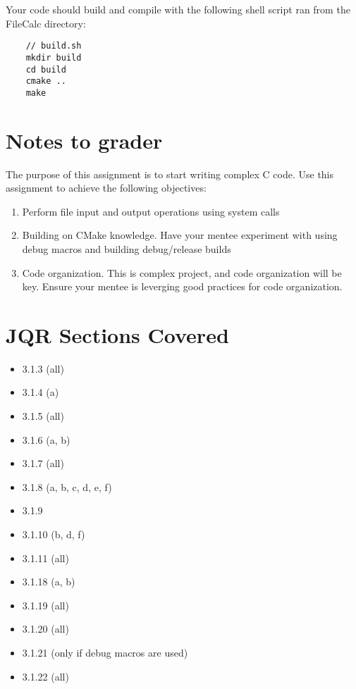 \documentclass[letterpaper,12pt]{article}
\begin{document}
	Your code should build and compile with the following shell script ran from the FileCalc directory:

	\begin{lstlisting}
	// build.sh
	mkdir build
	cd build
	cmake .. 
	make
	\end{lstlisting}
	
	
	\section{Notes to grader}
	The purpose of this assignment is to start writing complex C code. Use this assignment to achieve the following objectives:
	\begin{enumerate}
		\item Perform file input and output operations using system calls
		\item Building on CMake knowledge. Have your mentee experiment with using debug macros and building debug/release builds
		\item Code organization. This is complex project, and code organization will be key. Ensure your mentee is leverging good practices for code organization.
	\end{enumerate}

	\section{JQR Sections Covered}
	\begin{itemize}
		\item 3.1.3 (all)
		\item 3.1.4 (a)
		\item 3.1.5 (all)
		\item 3.1.6 (a, b)
		\item 3.1.7 (all)
		\item 3.1.8 (a, b, c, d, e, f) 
		\item 3.1.9
		\item 3.1.10 (b, d, f)
		\item 3.1.11 (all)
		\item 3.1.18 (a, b)
		\item 3.1.19 (all)
		\item 3.1.20 (all)
		\item 3.1.21 (only if debug macros are used)
		\item 3.1.22 (all)
	\end{itemize}
	
	
\end{document}
